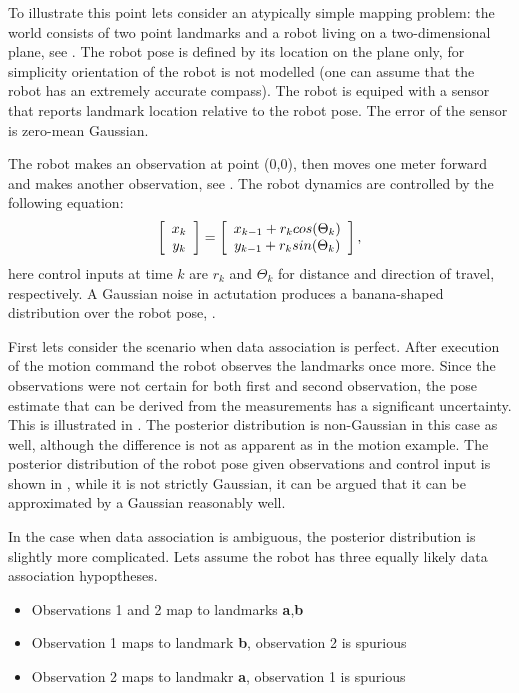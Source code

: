 To illustrate this point lets consider an atypically simple mapping
problem: the world consists of two point landmarks and a robot living
on a two-dimensional plane, see . The robot
pose is defined by its location on the plane only, for simplicity
orientation of the robot is not modelled (one can assume that the
robot has an extremely accurate compass). The robot is equiped with a
sensor that reports landmark location relative to the robot pose. The
error of the sensor is zero-mean Gaussian.

The robot makes an observation at point (0,0), then moves one meter
forward and makes another observation,
see . The robot dynamics are controlled by
the following equation:
$$
  \left[\begin{array}{c} x_k\\y_k \end{array} \right] = \left[\begin{array}{c}  x_{k-1} + r_k cos(\Theta_k)\\
                               y_{k-1} + r_k sin(\Theta_k)  \end{array} \right],
$$
here control inputs at time $k$ are $r_k$ and $\Theta_k$ for distance
and direction of travel, respectively. A Gaussian noise in actutation
produces a banana-shaped distribution over the robot pose,
.

First lets consider the scenario when data association is perfect.
After execution of the motion command the robot observes the landmarks
once more. Since the observations were not certain for both first and
second observation, the pose estimate that can be derived from the
measurements has a significant uncertainty. This is illustrated in
. The posterior distribution is non-Gaussian
in this case as well, although the difference is not as apparent as in
the motion example. The posterior distribution of the robot pose given
observations and control input is shown in
, while it is not strictly Gaussian, it can
be argued that it can be approximated by a Gaussian reasonably well.

In the case when data association is ambiguous, the posterior
distribution is slightly more complicated. Lets assume the robot has
three equally likely data association hypoptheses. 

\begin{itemize}
\item Observations 1 and 2 map to landmarks {\bf a},{\bf b}
\item Observation 1 maps to landmark {\bf b}, observation 2 is spurious
\item Observation 2 maps to landmakr {\bf a}, observation 1 is spurious
\end{itemize}

